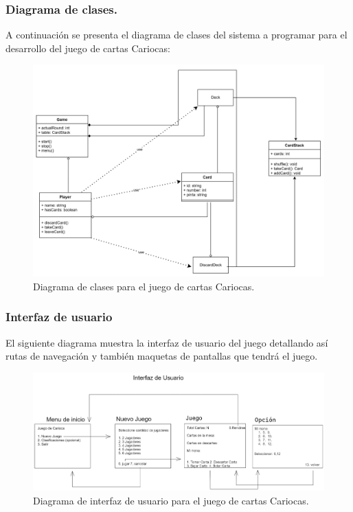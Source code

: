 \documentclass[60pt]{article}
\begin{document}
\subsubsection{Diagrama de clases.}\label{cap:diagrama-clases}
A continuación se presenta el diagrama de clases del sistema a programar para el desarrollo del juego de cartas Cariocas:
\begin{figure}[H]
    \centering
    \includegraphics[width=15cm]{diclass.png}
    \caption{Diagrama de clases para el juego de cartas Cariocas.}
\end{figure}
\subsubsection{Interfaz de usuario}\label{cap:interfaz-usuario}
El siguiente diagrama muestra la interfaz de usuario del juego detallando así rutas de navegación y también maquetas de pantallas que tendrá el juego.
\begin{figure}[H]
    \centering
    \includegraphics[width=15cm]{interfaz.png}
    \caption{Diagrama de interfaz de usuario para el juego de cartas Cariocas.}
\end{figure}
\clearpage
\end{document}
